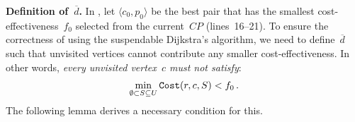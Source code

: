 \textbf{Definition of~$\overline{d}$.}
In \Improved, let $\langle c_0,p_0 \rangle$ be the best pair that has the smallest cost-effectiveness~$f_0$ selected from the current~$CP$ (lines~16--21). To ensure the correctness of using the suspendable Dijkstra’s algorithm, we need to define~$\overline{d}$ such that unvisited vertices cannot contribute any smaller cost-effectiveness. In other words, \emph{every unvisited vertex~$c$ must not satisfy}:
\begin{gather}
\label{eq: original target}
    \min_{\emptyset \subset S \subseteq U} \mathtt{Cost}(r,c,S)<f_0 \,.
\end{gather}
\noindent The following lemma derives a necessary condition for this.


